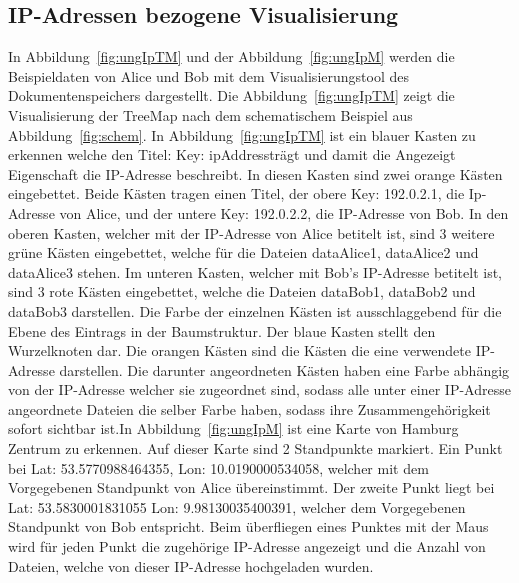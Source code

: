 \documentclass[
    fontsize=12pt,
    headings=small,
    parskip=half,           %
    bibliography=totoc,
    numbers=noenddot,       %
    open=any,               %
    ]{scrreprt}
\begin{document}
    \subsection{IP-Adressen bezogene Visualisierung} \label{ipVis}

In Abbildung~\ref{fig:ungIpTM} und der Abbildung~\ref{fig:ungIpM} werden die Beispieldaten von Alice und Bob mit dem Visualisierungstool des Dokumentenspeichers dargestellt.
Die Abbildung~\ref{fig:ungIpTM} zeigt die Visualisierung der TreeMap nach dem schematischem Beispiel aus Abbildung~\ref{fig:schem}. 
In Abbildung~\ref{fig:ungIpTM} ist ein blauer Kasten zu erkennen welche den Titel: \glqq Key: ipAddress\grqq trägt und damit die Angezeigt Eigenschaft die IP-Adresse beschreibt.
In diesen Kasten sind zwei orange Kästen eingebettet.
Beide Kästen tragen einen Titel, der obere \glqq Key: 192.0.2.1\grqq, die Ip-Adresse von Alice, und der untere \glqq Key: 192.0.2.2\grqq, die IP-Adresse von Bob.
In den oberen Kasten, welcher mit der IP-Adresse von Alice betitelt ist, sind 3 weitere grüne Kästen eingebettet, welche für die Dateien dataAlice1, dataAlice2 und dataAlice3 stehen.
Im unteren Kasten, welcher mit Bob's IP-Adresse betitelt ist, sind 3 rote Kästen eingebettet, welche die Dateien dataBob1, dataBob2 und dataBob3 darstellen.
Die Farbe der einzelnen Kästen ist ausschlaggebend für die Ebene des Eintrags in der Baumstruktur.
Der blaue Kasten stellt den Wurzelknoten dar.
Die orangen Kästen sind die Kästen die eine verwendete IP-Adresse darstellen.
Die darunter angeordneten Kästen haben eine Farbe abhängig von der IP-Adresse welcher sie zugeordnet sind, sodass alle unter einer IP-Adresse angeordnete Dateien die selber Farbe haben, sodass ihre Zusammengehörigkeit sofort sichtbar ist.In Abbildung~\ref{fig:ungIpM} ist eine Karte von Hamburg Zentrum zu erkennen.
Auf dieser Karte sind 2 Standpunkte markiert.
Ein Punkt bei \ac{Lat}: 53.5770988464355, \ac{Lon}: 10.0190000534058, welcher mit dem Vorgegebenen Standpunkt von Alice übereinstimmt.
Der zweite Punkt liegt bei \ac{Lat}: 53.5830001831055 \ac{Lon}: 9.98130035400391, welcher dem Vorgegebenen Standpunkt von Bob entspricht.
Beim überfliegen eines Punktes mit der Maus wird für jeden Punkt die zugehörige IP-Adresse angezeigt und die Anzahl von Dateien, welche von dieser IP-Adresse hochgeladen wurden.
\end{document}
